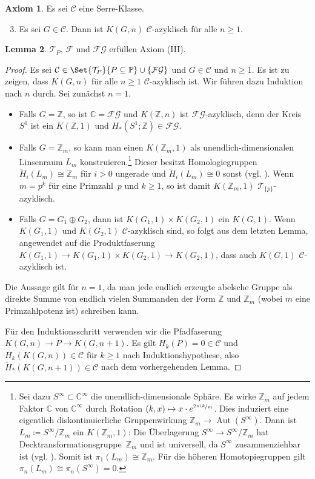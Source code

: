\documentclass[11pt, a4paper, german]{article}
\theoremstyle{definition}
\newtheorem{lem}{Lemma}
\newtheorem{axiom}[lem]{Axiom}
\theoremstyle{remark}
\newcommand{\Z}{\mathbb{Z}} %
\newcommand{\C}{\mathbb{C}} %
\newcommand{\SC}{\mathcal{C}} %
\newcommand{\FG}{\mathcal{FG}} %
\newcommand{\T}{\mathcal{T}} %
\newcommand{\F}{\mathcal{F}} %
\DeclareMathOperator{\Aut}{Aut} %
\newcommand{\Primes}{\mathbb{P}} %
\begin{document}
\begin{axiom}
  Es sei $\SC$ eine Serre-Klasse.
  \begin{enumerate}[label=(\Roman*)]
    \setcounter{enumi}{2}
    \item Es sei $G \in \SC$.
    Dann ist $K(G, n)$ $\SC$-azyklisch für alle $n \geq 1$.
  \end{enumerate}
\end{axiom}

\begin{lem}\label{homology-kgn-in-c}
  $\T_P$, $\F$ und $\FG$ erfüllen Axiom (III).
\end{lem}

\begin{proof}
  Es sei $\SC \in \Set{\T_P}{P \subseteq \Primes} \cup \{ \FG \}$ und $G \in \SC$ und $n \geq 1$.
  Es ist zu zeigen, dass $K(G, n)$ für alle $n \geq 1$ $\SC$-azyklisch ist.
  Wir führen dazu Induktion nach $n$ durch.
  Sei zunächst $n = 1$.
  \begin{itemize}
    \item Falls $G = \Z$, so ist $\C = \FG$ und $K(\Z, n)$ ist $\FG$-azyklisch, denn der Kreis $S^1$ ist ein $K(\Z, 1)$ und $H_*(S^1; \Z) \in \FG$.
    \item Falls $G = \Z_m$, so kann man einen $K(\Z_m, 1)$ als unendlich-dimensionalen Linsenraum $L_m$ konstruieren.\footnote{
      Sei dazu $S^\infty \subset \C^\infty$ die unendlich-dimensionale Sphäre.
      Es wirke $\Z_m$ auf jedem Faktor $\C$ von $\C^\infty$ durch Rotation $(k, x) \mapsto x \cdot e^{\nicefrac{2 \pi i k}{m}}$. Dies induziert eine eigentlich diskontinuierliche Gruppenwirkung $\Z_m \to \Aut(S^\infty)$.
      Dann ist $L_m \coloneqq S^\infty / \Z_m$ ein $K(\Z_m, 1)$: Die Überlagerung $S^\infty \to S^\infty / \Z_m$ hat Decktransformationsgruppe~$\Z_m$ und ist universell, da $S^\infty$ zusammenziehbar ist (vgl. \cite[\mbox{}1B.3-1B.4]{hatcher:at}). Somit ist $\pi_1(L_m) \cong \Z_m$.
      Für die höheren Homotopiegruppen gilt $\pi_n(L_m) \cong \pi_n(S^\infty) = 0$.
    }
    Dieser besitzt Homologiegruppen $\tilde{H}_i(L_m) \cong \Z_m$ für $i > 0$ ungerade und $\tilde{H}_i(L_m) \cong 0$ sonst (vgl. \cite[\mbox{}2.43]{hatcher:at}).
    Wenn $m = p^k$ für eine Primzahl~$p$ und $k \geq 1$, so ist damit $K(\Z_m, 1)$ $\T_{\{ p \}}$-azyklisch.
    \item Falls $G = G_1 \oplus G_2$, dann ist $K(G_1, 1) \times K(G_2, 1)$ ein $K(G, 1)$.
    Wenn $K(G_1, 1)$ und $K(G_2, 1)$ $\SC$-azyklisch sind, so folgt aus dem letzten Lemma, angewendet auf die Produktfaserung $K(G_1, 1) \to K(G_1, 1) \times K(G_2, 1) \to K(G_2, 1)$, dass auch $K(G, 1)$ $\SC$-azyklisch ist.
  \end{itemize}
  Die Aussage gilt für $n=1$, da man jede endlich erzeugte abelsche Gruppe als direkte Summe von endlich vielen Summanden der Form $\Z$ und $\Z_m$ (wobei $m$ eine Primzahlpotenz ist) schreiben kann.

  Für den Induktionsschritt verwenden wir die Pfadfaserung $K(G, n) \to P \to K(G, n{+}1)$.
  Es gilt $H_k(P) = 0 \in \SC$ und $H_k(K(G, n)) \in \SC$ für $k \geq 1$ nach Induktionshypothese, also $\widetilde{H}_*(K(G, n{+}1)) \in \SC$ nach dem vorhergehenden Lemma.
\end{proof}
\end{document}
